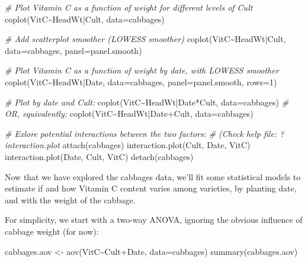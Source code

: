 \documentclass[
]{article}
\newenvironment{Shaded}{\begin{snugshade}}{\end{snugshade}}
\newcommand{\AttributeTok}[1]{\textcolor[rgb]{0.77,0.63,0.00}{#1}}
\newcommand{\CommentTok}[1]{\textcolor[rgb]{0.56,0.35,0.01}{\textit{#1}}}
\newcommand{\DecValTok}[1]{\textcolor[rgb]{0.00,0.00,0.81}{#1}}
\newcommand{\FunctionTok}[1]{\textcolor[rgb]{0.00,0.00,0.00}{#1}}
\newcommand{\NormalTok}[1]{#1}
\newcommand{\OtherTok}[1]{\textcolor[rgb]{0.56,0.35,0.01}{#1}}
\newcommand{\SpecialCharTok}[1]{\textcolor[rgb]{0.00,0.00,0.00}{#1}}
\begin{document}
\begin{Shaded}
\begin{Highlighting}[]
\CommentTok{\# Plot Vitamin C as a function of weight for different levels of Cult}
\FunctionTok{coplot}\NormalTok{(VitC}\SpecialCharTok{\textasciitilde{}}\NormalTok{HeadWt}\SpecialCharTok{|}\NormalTok{Cult, }\AttributeTok{data=}\NormalTok{cabbages)}

\CommentTok{\# Add scatterplot smoother (LOWESS smoother)}
\FunctionTok{coplot}\NormalTok{(VitC}\SpecialCharTok{\textasciitilde{}}\NormalTok{HeadWt}\SpecialCharTok{|}\NormalTok{Cult, }\AttributeTok{data=}\NormalTok{cabbages, }\AttributeTok{panel=}\NormalTok{panel.smooth)}

\CommentTok{\# Plot Vitamin C as a function of weight by date, with LOWESS smoother}
\FunctionTok{coplot}\NormalTok{(VitC}\SpecialCharTok{\textasciitilde{}}\NormalTok{HeadWt}\SpecialCharTok{|}\NormalTok{Date, }\AttributeTok{data=}\NormalTok{cabbages, }\AttributeTok{panel=}\NormalTok{panel.smooth, }\AttributeTok{rows=}\DecValTok{1}\NormalTok{)}

\CommentTok{\# Plot by date and Cult:}
\FunctionTok{coplot}\NormalTok{(VitC}\SpecialCharTok{\textasciitilde{}}\NormalTok{HeadWt}\SpecialCharTok{|}\NormalTok{Date}\SpecialCharTok{*}\NormalTok{Cult, }\AttributeTok{data=}\NormalTok{cabbages) }\CommentTok{\# OR, equivalently:}
\FunctionTok{coplot}\NormalTok{(VitC}\SpecialCharTok{\textasciitilde{}}\NormalTok{HeadWt}\SpecialCharTok{|}\NormalTok{Date}\SpecialCharTok{+}\NormalTok{Cult, }\AttributeTok{data=}\NormalTok{cabbages)}

\CommentTok{\# Exlore potential interactions between the two factors:}
\CommentTok{\# (Check help file: \textquotesingle{}?interaction.plot\textquotesingle{}}
\FunctionTok{attach}\NormalTok{(cabbages)}
\FunctionTok{interaction.plot}\NormalTok{(Cult, Date, VitC)}
\FunctionTok{interaction.plot}\NormalTok{(Date, Cult, VitC)}
\FunctionTok{detach}\NormalTok{(cabbages)}
\end{Highlighting}
\end{Shaded}

Now that we have explored the cabbages data, we'll fit some statistical
models to estimate if and how Vitamin C content varies among varieties,
by planting date, and with the weight of the cabbage.

For simplicity, we start with a two-way ANOVA, ignoring the obvious
influence of cabbage weight (for now):

\begin{Shaded}
\begin{Highlighting}[]
\NormalTok{cabbages.aov }\OtherTok{\textless{}{-}} \FunctionTok{aov}\NormalTok{(VitC}\SpecialCharTok{\textasciitilde{}}\NormalTok{Cult}\SpecialCharTok{+}\NormalTok{Date, }\AttributeTok{data=}\NormalTok{cabbages)}
\FunctionTok{summary}\NormalTok{(cabbages.aov)}
\end{Highlighting}
\end{Shaded}
\end{document}
